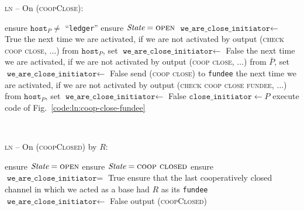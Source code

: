 \begin{center}
  \begin{processbox}{\textsc{ln} -- On (\textsc{coopClose}):}
    \begin{algorithmic}[1]
      \State ensure $\texttt{host}_P \neq$ ``\texttt{ledger}''
      \State ensure $\itistate = \textsc{open}$
      \State $\texttt{we\_are\_close\_initiator} \gets$ True
       
         
          \State the next time we are activated, if we are not activated by
          output (\textsc{check coop close}, $\dots$) from $\texttt{host}_P$,
          set $\texttt{we\_are\_close\_initiator} \gets$ False
        \Else \: 
          \State the next time we are activated, if we are not activated by
          output (\textsc{coop close}, $\dots$) from $\bar{P}$, set
          $\texttt{we\_are\_close\_initiator} \gets$ False
        \EndIf
        \State send (\textsc{coop close}) to \texttt{fundee}
      \Else \: 
        \State the next time we are activated, if we are not activated by output
        (\textsc{check coop close fundee}, $\dots$) from $\texttt{host}_P$, set
        $\texttt{we\_are\_close\_initiator} \gets$ False
        \State $\texttt{close\_initiator} \gets P$
        \State execute code of Fig.~\ref{code:ln:coop-close-fundee}
        \label{code:ln:coop-close:goto}
      \EndIf
    \end{algorithmic}
  \end{processbox}
  \label{code:ln:coop-close}
\end{center} \ \\

\begin{center}
  \begin{processbox}{\textsc{ln} -- On (\textsc{coopClosed}) by $R$:}
    \ \\
    \begin{algorithmic}[1]
       
        \State ensure $\itistate = \textsc{open}$
      \Else \: 
        \State ensure $\itistate = \textsc{coop closed}$
      \EndIf
      \State ensure $\texttt{we\_are\_close\_initiator} =$ True
      \State ensure that the last cooperatively closed channel in which we acted
      as a base had $R$ as its \texttt{fundee}
      \State $\texttt{we\_are\_close\_initiator} \gets$ False
      \State output (\textsc{coopClosed})
    \end{algorithmic}
  \end{processbox}
  \label{code:ln:coop-closed-to-initiator}
\end{center} \ \\

